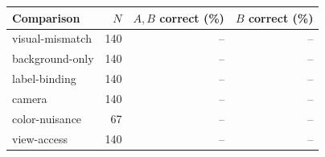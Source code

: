 \begin{tabular}{lrrr}
\toprule
Comparison & $N$ & $A,B$ correct (\%) & $B$ correct (\%) \\
\midrule
visual-mismatch & 140 & -- & -- \\
background-only & 140 & -- & -- \\
label-binding & 140 & -- & -- \\
camera & 140 & -- & -- \\
color-nuisance & 67 & -- & -- \\
view-access & 140 & -- & -- \\
\bottomrule
\end{tabular}
